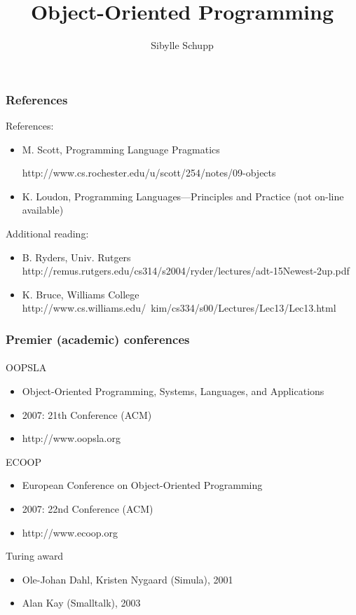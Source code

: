 \documentclass{beamer}
\title[OOP]
{Object-Oriented Programming}
\subtitle{} %
\author[Sibylle Schupp] %
{Sibylle Schupp\inst{1}}
\institute[Universities of Somewhere and Elsewhere] 
{
  \inst{1}%
  Department of Computing Science\\
  Chalmers University of Technology
}
\date%
\begin{document}
\begin{frame}
  \titlepage
\end{frame}

\begin{frame}[fragile]
\frametitle{References}
References:
\begin{itemize}
\item M. Scott, Programming Language Pragmatics

\textsf{http://www.cs.rochester.edu/u/scott/254/notes/09-objects}
\item K. Loudon, Programming Languages---Principles and Practice
(not on-line available)
\end{itemize}

Additional reading:
\begin{itemize}
\item B. Ryders, Univ. Rutgers
\textsf{
http://remus.rutgers.edu/cs314/s2004/ryder/lectures/adt-15Newest-2up.pdf
}
%
\item K. Bruce, Williams College
\textsf{
http://www.cs.williams.edu/~kim/cs334/s00/Lectures/Lec13/Lec13.html}
\end{itemize}
\end{frame}

\begin{frame}[fragile]
\frametitle{Premier (academic) conferences}
\framesubtitle{}

OOPSLA
\begin{itemize}
\item Object-Oriented Programming, Systems, Languages, and Applications
\item 2007: 21th Conference (ACM)
\item http://www.oopsla.org
\end{itemize}

ECOOP
\begin{itemize}
\item European Conference on Object-Oriented Programming
\item 2007: 22nd Conference (ACM)
\item http://www.ecoop.org
\end{itemize}

Turing award
\begin{itemize}
\item Ole-Johan Dahl, Kristen Nygaard (Simula), 2001
\item Alan Kay (Smalltalk), 2003
\end{itemize}
\end{frame}
\end{document}
